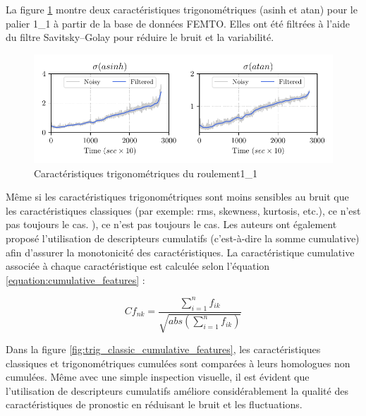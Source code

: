 La figure \ref{fig:trigonometric_features_bearing1_1} montre deux caractéristiques trigonométriques (asinh et atan) pour le palier 1\_1 à partir de la base de données FEMTO. Elles ont été filtrées à l'aide du filtre Savitsky--Golay pour réduire le bruit et la variabilité.

\begin{figure}[h]
	\centering
	\includegraphics[width=0.8\linewidth]{figures/trigonometric_features.pdf}
	\caption{Caractéristiques trigonométriques du roulement1\_1}%
	\label{fig:trigonometric_features_bearing1_1}
\end{figure}


Même si les caractéristiques trigonométriques sont moins sensibles au bruit que les caractéristiques classiques (par exemple: rms, skewness, kurtosis, etc.), ce n'est pas toujours le cas. ), ce n'est pas toujours le cas. Les auteurs ont également proposé l'utilisation de descripteurs cumulatifs (c'est-à-dire la somme cumulative) afin d'assurer la monotonicité des caractéristiques. La caractéristique cumulative associée à chaque caractéristique est calculée selon l'équation \ref{equation:cumulative_features} :

\begin{equation}
Cf_{nk} = \frac{\sum_{i=1}^n f_{ik}} {\sqrt{abs\left(\sum_{i=1}^nf_{ik}\right)}}
\label{equation:cumulative_features}
\end{equation}

Dans la figure \ref{fig:trig_classic_cumulative_features}, les caractéristiques classiques et trigonométriques cumulées sont comparées à leurs homologues non cumulées. Même avec une simple inspection visuelle, il est évident que l'utilisation de descripteurs cumulatifs améliore considérablement la qualité des caractéristiques de pronostic en réduisant le bruit et les fluctuations. 

